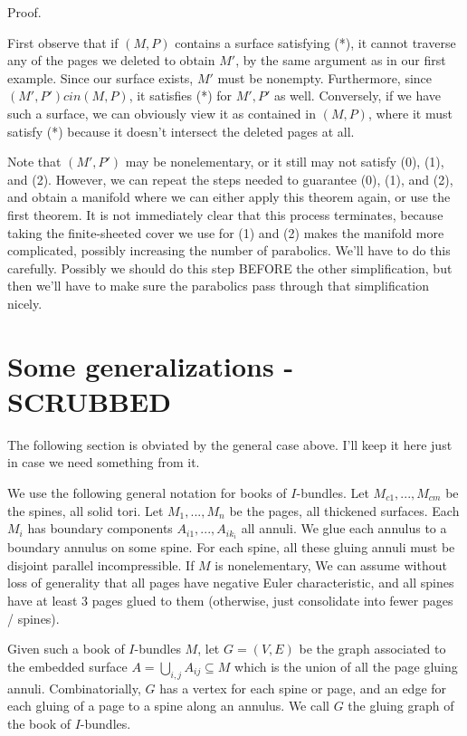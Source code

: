 \documentclass[12pt]{amsart}
\theoremstyle{definition}
\theoremstyle{remark}
\newcommand{\cin}{\subseteq}
\begin{document}
Proof.

First observe that if $(M,P)$ contains a surface satisfying (*), it cannot
traverse any of the pages we deleted to obtain $M'$, by the same argument as in
our first example.  Since our surface exists, $M'$ must be nonempty.
Furthermore, since $(M',P') cin (M,P)$, it satisfies (*) for $M',P'$ as well.
Conversely, if we have such a surface, we can obviously view it as contained in
$(M,P)$, where it must satisfy (*) because it doesn't intersect the deleted
pages at all.

Note that $(M',P')$ may be nonelementary, or it still may not satisfy (0), (1),
and (2).  However, we can repeat the steps needed to guarantee (0), (1), and
(2), and obtain a manifold where we can either apply this theorem again, or use
the first theorem. It is not immediately clear that this process terminates,
because taking the finite-sheeted cover we use for (1) and (2) makes the
manifold more complicated, possibly increasing the number of parabolics. We'll
have to do this carefully. Possibly we should do this step BEFORE the other
simplification, but then we'll have to make sure the parabolics pass through
that simplification nicely.

\section{Some generalizations - SCRUBBED}

The following section is obviated by the general case above. I'll keep it here
just in case we need something from it.

We use the following general notation for books of $I$-bundles. Let
$M_{c1},...,M_{cm}$ be the spines, all solid tori. Let $M_1,...,M_n$ be the
pages, all thickened surfaces. Each $M_i$ has boundary components
$A_{i1},...,A_{ik_i}$ all annuli. We glue each annulus to a boundary annulus on
some spine. For each spine, all these gluing annuli must be disjoint parallel
incompressible. If $M$ is nonelementary, We can assume without loss of
generality that all pages have negative Euler characteristic, and all spines
have at least 3 pages glued to them (otherwise, just consolidate into fewer
pages / spines).

Given such a book of $I$-bundles $M$, let $G=(V,E)$ be the graph associated to
the embedded surface $A = \bigcup_{i,j} A_{ij} \cin M$ which is the union of
all the page gluing annuli. Combinatorially, $G$ has a vertex for each spine or
page, and an edge for each gluing of a page to a spine along an annulus. We
call $G$ the gluing graph of the book of $I$-bundles.
\end{document}
